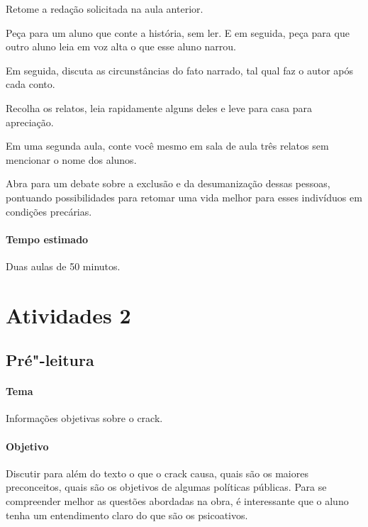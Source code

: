 \documentclass[11pt]{extarticle}
\begin{document}
	\item Retome a redação solicitada na aula anterior. 
	\item Peça para um aluno que conte a história, sem ler. E 
	em seguida, peça para que outro aluno leia em voz alta o que 
	esse aluno narrou.
	\item Em seguida, discuta as circunstâncias do fato narrado, 
	tal qual faz o autor após cada conto. 
	\item Recolha os relatos, leia rapidamente alguns deles e leve para 
	casa para apreciação. 
	\item Em uma segunda aula, conte você mesmo em sala de aula 
	três relatos sem mencionar o nome dos alunos. 
	\item Abra para um debate sobre a exclusão e da desumanização 
	dessas pessoas, pontuando possibilidades para retomar uma vida 
	melhor para esses indivíduos em condições precárias.

\paragraph{Tempo estimado} Duas aulas de 50 minutos. 

\section{Atividades 2}




\subsection{Pré"-leitura}

\paragraph{Tema} Informações objetivas sobre o crack.

\paragraph{Objetivo} Discutir para além do texto o que o crack causa, quais são 
	os maiores preconceitos, quais são os objetivos de algumas políticas públicas.
	Para se compreender melhor as questões abordadas na obra, é
	interessante que o aluno tenha um entendimento claro do que são os
	psicoativos. 
\end{document}
